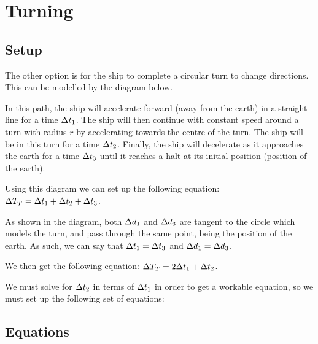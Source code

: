 \section{Turning}
	\subsection{Setup}
		The other option is for the ship to complete a circular turn to change directions.
		This can be modelled by the diagram below.
		
		In this path, the ship will accelerate forward (away from the earth) in a straight line for a time $\mathrm{\Delta} t_1$.
		The ship will then continue with constant speed around a turn with radius $r$ by accelerating towards the centre of the turn.
		The ship will be in this turn for a time $\mathrm{\Delta} t_2$. Finally, the ship will decelerate as it approaches the  earth for a time $\mathrm{\Delta} t_3$ until it reaches a halt at its initial position (position of the earth).

		Using this diagram we can set up the following equation: $\mathrm{\Delta} T_T = \mathrm{\Delta} t_1 + \mathrm{\Delta} t_2 + \mathrm{\Delta} t_3$.

		As shown in the diagram, both $\mathrm{\Delta} d_1$ and $\mathrm{\Delta} d_3$ are tangent to the circle which models the turn, and pass through the same point, being the position of the earth.
		As such, we can say that $\mathrm{\Delta} t_1 = \mathrm{\Delta} t_3$ and $\mathrm{\Delta} d_1 = \mathrm{\Delta} d_3$.

		We then get the following equation: $\mathrm{\Delta} T_T = 2\mathrm{\Delta} t_1 + \mathrm{\Delta} t_2$.

		We must solve for $\mathrm{\Delta} t_2$ in terms of $\mathrm{\Delta} t_1$ in order to get a workable equation, so we must set up the following set of 
		equations:
	\subsection{Equations}
